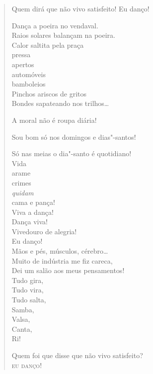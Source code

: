 \begin{verse}
Quem dirá que não vivo satisfeito! Eu danço!

Dança a poeira no vendaval.\\
Raios solares balançam na poeira.\\
Calor saltita pela praça\\
\qquad\qquad\qquad\quad pressa\\
\qquad\qquad\qquad\quad apertos\\
\qquad\qquad\qquad\quad automóveis\\
\qquad\qquad bamboleios\\
\qquad Pinchos ariscos de gritos\\
Bondes sapateando nos trilhos\ldots{}

A moral não é roupa diária!

Sou bom só nos domingos e dias"-santos!

Só nas meias o dia"-santo é quotidiano!\\
\qquad\qquad\qquad\quad Vida\\
\qquad\qquad\qquad\quad arame\\
\qquad\qquad\qquad\quad crimes\\
\qquad\qquad\qquad\quad \emph{quidam}\\
\qquad\qquad\qquad\quad cama e pança!\\
\qquad\qquad Viva a dança!\\
\qquad\qquad Dança viva!\\
\qquad Vivedouro de alegria!\\
Eu danço!\\
Mãos e pés, músculos, cérebro\ldots{}\\
\qquad Muito de indústria me fiz careca,\\
\qquad Dei um salão aos meus pensamentos!\\
\qquad\qquad\qquad\qquad Tudo gira,\\
\qquad\qquad\qquad\qquad Tudo vira,\\
\qquad\qquad\qquad\qquad Tudo salta,\\
\qquad\qquad\qquad\qquad Samba,\\
\qquad\qquad\qquad\qquad Valsa,\\
\qquad\qquad\qquad\qquad Canta,\\
\qquad\qquad\qquad\qquad Ri!

Quem foi que disse que não vivo satisfeito?\\
\textsc{eu danço}!
\end{verse}


